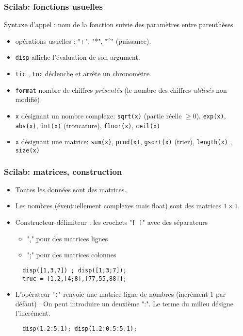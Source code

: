 \begin{frame}
  \frametitle{Scilab: fonctions usuelles}
Syntaxe d'appel : nom de la fonction suivie des paramètres entre parenthèses.
\begin{itemize}
  \item opérations usuelles : "+", "*", "\textasciicircum" (puissance).
  \item \texttt{disp} affiche l'évaluation de son argument.
  \item \texttt{tic} , \texttt{toc} déclenche et arrête un chronomètre.
  \item \texttt{format} nombre de chiffres \emph{présentés} (le nombre des chiffres \emph{utilisés} non modifié)
  \item \texttt{x} désignant un nombre complexe: \texttt{sqrt(x)} (partie réelle $\geq 0$), \texttt{exp(x)}, \texttt{abs(x)}, \texttt{int(x)} (troncature), \texttt{floor(x)}, \texttt{ceil(x)}
  \item \texttt{x} désignant une matrice: \texttt{sum(x)}, \texttt{prod(x)}, \texttt{gsort(x)} (trier), \texttt{length(x)} , \texttt{size(x)}
\end{itemize}

\end{frame}

\begin{frame}[fragile]
  \frametitle{Scilab: matrices, construction}
\begin{itemize}
  \item Toutes les données sont des matrices.
  \item Les nombres (éventuellement complexes mais float) sont des matrices $1\times1$.
  \item Constructeur-délimiteur : les crochets "\texttt{[ ]}" avec des séparateurs 
  \begin{itemize}
    \item "," pour des matrices lignes
    \item ";" pour des matrices colonnes
  \end{itemize}
\begin{verbatim}
  disp([1,3,7]) ; disp([1;3;7]);
  truc = [1,2,[4;8],[77,55,88]];
\end{verbatim}

  \item L'opérateur "\texttt{:}" renvoie une matrice ligne de nombres (incrément 1 par défaut) . On peut introduire un deuxième ":". Le terme du milieu désigne l'incrément.
\begin{verbatim}
  disp(1.2:5.1); disp(1.2:0.5:5.1);
\end{verbatim}
\end{itemize}
\end{frame}

